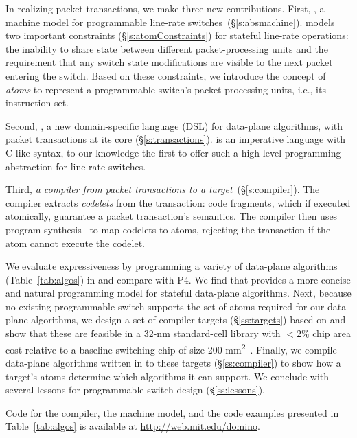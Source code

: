 In realizing packet transactions, we make three new contributions.  First, {\em
\absmachine}, a machine model for programmable line-rate
switches~(\S\ref{s:absmachine}).  \absmachine models two important constraints
(\S\ref{s:atomConstraints}) for stateful line-rate operations: the inability to
share state between different packet-processing units and the requirement that
any switch state modifications are visible to the next packet entering the
switch. Based on these constraints, we introduce the concept of {\em atoms} to
represent a programmable switch's packet-processing units, i.e., its
instruction set.

Second, {\em \pktlanguage{}}, a new domain-specific language (DSL) for
data-plane algorithms, with packet transactions at its core
(\S\ref{s:transactions}).  \pktlanguage is an imperative language with C-like
syntax, to our knowledge the first to offer such a high-level programming
abstraction for line-rate switches.

Third, {\em a compiler from \pktlanguage packet transactions to a \absmachine
target}~(\S\ref{s:compiler}). The \pktlanguage compiler extracts {\em codelets}
from the transaction: code fragments, which if executed atomically, guarantee a
packet transaction's semantics. The compiler then uses program
synthesis~\cite{sketch_asplos} to map codelets to atoms, rejecting the
transaction if the atom cannot execute the codelet.


We evaluate expressiveness by programming a variety of data-plane algorithms
(Table~\ref{tab:algos}) in \pktlanguage and compare with P4. We find that
\pktlanguage provides a more concise and natural programming model for stateful
data-plane algorithms.  Next, because no existing programmable switch supports
the set of atoms required for our data-plane algorithms, we design a set of
compiler targets (\S\ref{ss:targets}) based on \absmachine and show that these
are feasible in a 32-nm standard-cell library with $< 2\%$ chip area cost
relative to a baseline switching chip of size 200
\si{\milli\metre\squared}~\cite{gibb_parsing}.  Finally, we compile data-plane
algorithms written in \pktlanguage to these targets (\S\ref{ss:compiler}) to
show how a target's atoms determine which algorithms it can support. We
conclude with several lessons for programmable switch design
(\S\ref{ss:lessons}).

Code for the \pktlanguage compiler, the \absmachine machine model, and the code
examples presented in Table~\ref{tab:algos} is available at
\url{http://web.mit.edu/domino}.
